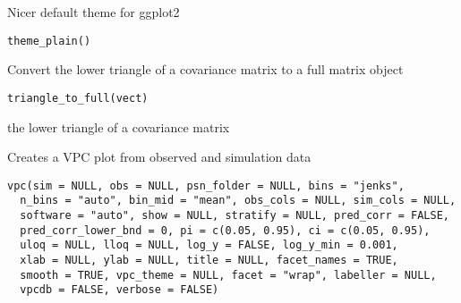 \documentclass[letterpaper]{book}
\begin{document}
%
\begin{Description}\relax
Nicer default theme for ggplot2
\end{Description}
%
\begin{Usage}
\begin{verbatim}
theme_plain()
\end{verbatim}
\end{Usage}
%
\begin{Description}\relax
Convert the lower triangle of a covariance matrix to a full matrix object
\end{Description}
%
\begin{Usage}
\begin{verbatim}
triangle_to_full(vect)
\end{verbatim}
\end{Usage}
%
\begin{Arguments}
\begin{ldescription}
\item[\code{vect}] the lower triangle of a covariance matrix
\end{ldescription}
\end{Arguments}
%
\begin{Description}\relax
Creates a VPC plot from observed and simulation data
\end{Description}
%
\begin{Usage}
\begin{verbatim}
vpc(sim = NULL, obs = NULL, psn_folder = NULL, bins = "jenks",
  n_bins = "auto", bin_mid = "mean", obs_cols = NULL, sim_cols = NULL,
  software = "auto", show = NULL, stratify = NULL, pred_corr = FALSE,
  pred_corr_lower_bnd = 0, pi = c(0.05, 0.95), ci = c(0.05, 0.95),
  uloq = NULL, lloq = NULL, log_y = FALSE, log_y_min = 0.001,
  xlab = NULL, ylab = NULL, title = NULL, facet_names = TRUE,
  smooth = TRUE, vpc_theme = NULL, facet = "wrap", labeller = NULL,
  vpcdb = FALSE, verbose = FALSE)
\end{verbatim}
\end{Usage}
%
\end{document}
